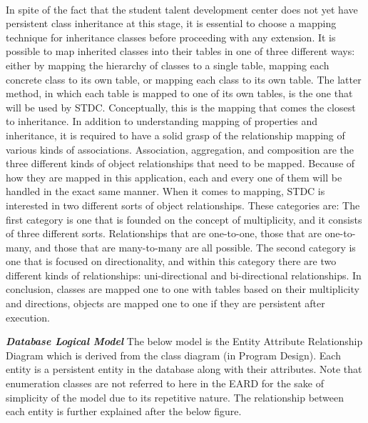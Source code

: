 \begin{justify}
\vspace{0.25cm}
\\
In spite of the fact that the student talent development center does not yet have persistent class inheritance at this stage, it is essential to choose a mapping technique for inheritance classes before proceeding with any extension. It is possible to map inherited classes into their tables in one of three different ways: either by mapping the hierarchy of classes to a single table, mapping each concrete class to its own table, or mapping each class to its own table. The latter method, in which each table is mapped to one of its own tables, is the one that will be used by STDC. Conceptually, this is the mapping that comes the closest to inheritance. In addition to understanding mapping of properties and inheritance, it is required to have a solid grasp of the relationship mapping of various kinds of associations. Association, aggregation, and composition are the three different kinds of object relationships that need to be mapped. Because of how they are mapped in this application, each and every one of them will be handled in the exact same manner.  When it comes to mapping, STDC is interested in two different sorts of object relationships. These categories are: The first category is one that is founded on the concept of multiplicity, and it consists of three different sorts. Relationships that are one-to-one, those that are one-to-many, and those that are many-to-many are all possible. The second category is one that is focused on directionality, and within this category there are two different kinds of relationships: uni-directional and bi-directional relationships.\newendline
In conclusion, classes are mapped one to one with tables based on their multiplicity and directions, objects are mapped one to one if they are persistent after execution.

\vspace{0.25cm}
\newendline \textbf{\textit{Database Logical Model}}\newendline
The below model is the Entity Attribute Relationship Diagram which is derived from the class diagram (in Program Design). Each entity is a persistent entity in the database along with their attributes. Note that enumeration classes are not referred to here in the EARD for the sake of simplicity of the model due to its repetitive nature. The relationship between each entity is further explained after the below figure.


\end{justify}
